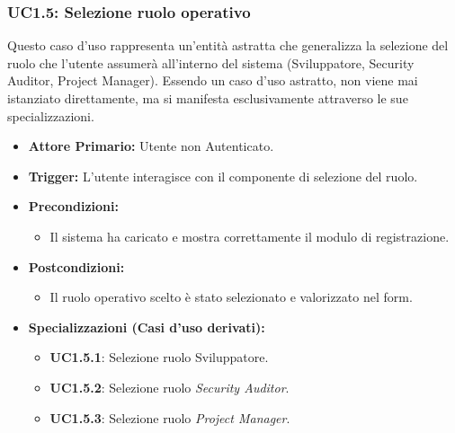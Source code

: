 \documentclass[12pt, a4paper]{article}
\begin{document}
\subsubsection{UC1.5: Selezione ruolo operativo}\label{uc:1.5}
Questo caso d'uso rappresenta un'entità astratta che generalizza la selezione del ruolo che l'utente assumerà all'interno del sistema (Sviluppatore, Security Auditor, Project Manager). Essendo un caso d'uso astratto, non viene mai istanziato direttamente, ma si manifesta esclusivamente attraverso le sue specializzazioni.
\begin{itemize}
    \item \textbf{Attore Primario:} Utente non Autenticato.
    \item \textbf{Trigger:} L'utente interagisce con il componente di selezione del ruolo.
    \item \textbf{Precondizioni:}\begin{itemize}\item Il sistema ha caricato e mostra correttamente il modulo di registrazione.\end{itemize}
    \item \textbf{Postcondizioni:}\begin{itemize}\item Il ruolo operativo scelto è stato selezionato e valorizzato nel form.\end{itemize}
    \item \textbf{Specializzazioni (Casi d'uso derivati):}
    \begin{itemize}
        \item \textbf{UC1.5.1}: Selezione ruolo Sviluppatore.
        \item \textbf{UC1.5.2}: Selezione ruolo \textit{Security Auditor}.
        \item \textbf{UC1.5.3}: Selezione ruolo \textit{Project Manager}.
    \end{itemize}
\end{itemize}
\end{document}
